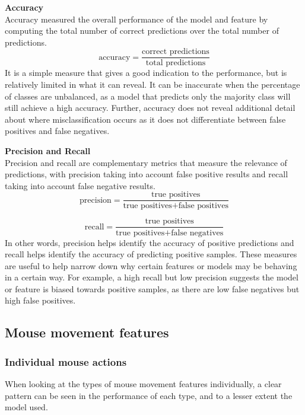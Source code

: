 \documentclass[Report.tex]{subfiles}
\begin{document}
\textbf{Accuracy} \\
Accuracy measured the overall performance of the model and feature by computing the total number of correct predictions over the total number of predictions.
\begin{equation*}
\text{accuracy} = \frac{\text{correct predictions}}{\text{total predictions}}
\end{equation*}
It is a simple measure that gives a good indication to the performance, but is relatively limited in what it can reveal. It can be inaccurate when the percentage of classes are unbalanced, as a model that predicts only the majority class will still achieve a high accuracy. Further, accuracy does not reveal additional detail about where misclassification occurs as it does not differentiate between false positives and false negatives. 

\textbf{Precision and Recall} \\
Precision and recall are complementary metrics that measure the relevance of predictions, with precision taking into account false positive results and recall taking into account false negative results. 
\begin{equation*}
\text{precision} = \frac{\text{true positives}}{\text{true positives} + \text{false positives}}
\end{equation*}

\begin{equation*}
\text{recall} = \frac{\text{true positives}}{\text{true positives} + \text{false negatives}}
\end{equation*}
In other words, precision helps identify the accuracy of positive predictions and recall helps identify the accuracy of predicting positive samples. These measures are useful to help narrow down why certain features or models may be behaving in a certain way. For example, a high recall but low precision suggests the model or feature is biased towards positive samples, as there are low false negatives but high false positives. 


\subsection{Mouse movement features}\label{sec:mm-features-results}

\subsubsection{Individual mouse actions}
When looking at the types of mouse movement features individually, a clear pattern can be seen in the performance of each type, and to a lesser extent the model used.
\end{document}

